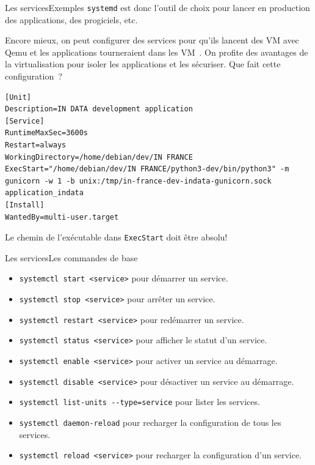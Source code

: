 \documentclass{beamer}
\begin{document}
    \begin{frame}[fragile]{Les services}{Exemples}
        \lstinline{systemd} est donc l'outil de choix pour lancer en production des applications, des progiciels, etc.

        Encore mieux, on peut configurer des services pour qu'ils lancent des VM avec Qemu et les applications tourneraient dans les VM~.
        On profite des avantages de la virtualisation pour isoler les applications et les sécuriser.
        \bigbreak
        Que fait cette configuration~?
        \begin{lstlisting}
[Unit]
Description=IN DATA development application
[Service]
RuntimeMaxSec=3600s
Restart=always
WorkingDirectory=/home/debian/dev/IN FRANCE
ExecStart="/home/debian/dev/IN FRANCE/python3-dev/bin/python3" -m gunicorn -w 1 -b unix:/tmp/in-france-dev-indata-gunicorn.sock application_indata
[Install]
WantedBy=multi-user.target
        \end{lstlisting}
        \begin{dangercolorbox}
            Le chemin de l'exécutable dans \lstinline{ExecStart} doit être absolu!
        \end{dangercolorbox}
    \end{frame}

    \begin{frame}{Les services}{Les commandes de base}
        \begin{itemize}
            \item \lstinline{systemctl start <service>} pour démarrer un service.
            \item \lstinline{systemctl stop <service>} pour arrêter un service.
            \item \lstinline{systemctl restart <service>} pour redémarrer un service.
            \item \lstinline{systemctl status <service>} pour afficher le statut d'un service.
            \item \lstinline{systemctl enable <service>} pour activer un service au démarrage.
            \item \lstinline{systemctl disable <service>} pour désactiver un service au démarrage.
            \item \lstinline{systemctl list-units --type=service} pour lister les services.
            \item \lstinline{systemctl daemon-reload} pour recharger la configuration de tous les services.
            \item \lstinline{systemctl reload <service>} pour recharger la configuration d'un service.
        \end{itemize}
    \end{frame}
\end{document}
